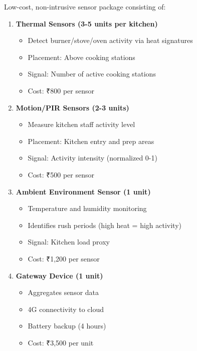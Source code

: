 \documentclass[11pt,a4paper]{article}
\begin{document}
Low-cost, non-intrusive sensor package consisting of:

\begin{enumerate}[leftmargin=*]
    \item \textbf{Thermal Sensors (3-5 units per kitchen)}
    \begin{itemize}
        \item Detect burner/stove/oven activity via heat signatures
        \item Placement: Above cooking stations
        \item Signal: Number of active cooking stations
        \item Cost: ₹800 per sensor
    \end{itemize}
    
    \item \textbf{Motion/PIR Sensors (2-3 units)}
    \begin{itemize}
        \item Measure kitchen staff activity level
        \item Placement: Kitchen entry and prep areas
        \item Signal: Activity intensity (normalized 0-1)
        \item Cost: ₹500 per sensor
    \end{itemize}
    
    \item \textbf{Ambient Environment Sensor (1 unit)}
    \begin{itemize}
        \item Temperature and humidity monitoring
        \item Identifies rush periods (high heat = high activity)
        \item Signal: Kitchen load proxy
        \item Cost: ₹1,200 per sensor
    \end{itemize}
    
    \item \textbf{Gateway Device (1 unit)}
    \begin{itemize}
        \item Aggregates sensor data
        \item 4G connectivity to cloud
        \item Battery backup (4 hours)
        \item Cost: ₹3,500 per unit
    \end{itemize}
\end{enumerate}
\end{document}

